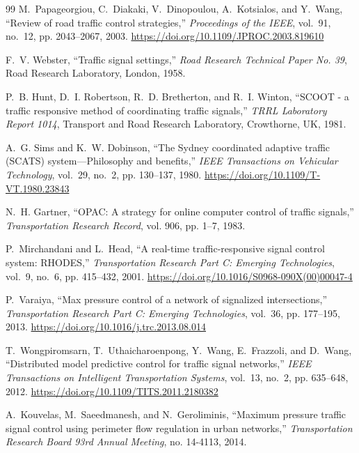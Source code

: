 \documentclass[11pt,journal,onecolumn]{article}
\begin{document}

\begin{thebibliography}{99}
M.~Papageorgiou, C.~Diakaki, V.~Dinopoulou, A.~Kotsialos, and Y.~Wang, ``Review of road traffic control strategies,'' \emph{Proceedings of the IEEE}, vol.~91, no.~12, pp. 2043--2067, 2003. \url{https://doi.org/10.1109/JPROC.2003.819610}

F.~V. Webster, ``Traffic signal settings,'' \emph{Road Research Technical Paper No. 39}, Road Research Laboratory, London, 1958.

P.~B. Hunt, D.~I. Robertson, R.~D. Bretherton, and R.~I. Winton, ``SCOOT - a traffic responsive method of coordinating traffic signals,'' \emph{TRRL Laboratory Report 1014}, Transport and Road Research Laboratory, Crowthorne, UK, 1981.

A.~G. Sims and K.~W. Dobinson, ``The Sydney coordinated adaptive traffic (SCATS) system---Philosophy and benefits,'' \emph{IEEE Transactions on Vehicular Technology}, vol.~29, no.~2, pp. 130--137, 1980. \url{https://doi.org/10.1109/T-VT.1980.23843}

N.~H. Gartner, ``OPAC: A strategy for online computer control of traffic signals,'' \emph{Transportation Research Record}, vol. 906, pp. 1--7, 1983.

P.~Mirchandani and L.~Head, ``A real-time traffic-responsive signal control system: RHODES,'' \emph{Transportation Research Part C: Emerging Technologies}, vol.~9, no.~6, pp. 415--432, 2001. \url{https://doi.org/10.1016/S0968-090X(00)00047-4}

P.~Varaiya, ``Max pressure control of a network of signalized intersections,'' \emph{Transportation Research Part C: Emerging Technologies}, vol.~36, pp. 177--195, 2013. \url{https://doi.org/10.1016/j.trc.2013.08.014}

T.~Wongpiromsarn, T.~Uthaicharoenpong, Y.~Wang, E.~Frazzoli, and D.~Wang, ``Distributed model predictive control for traffic signal networks,'' \emph{IEEE Transactions on Intelligent Transportation Systems}, vol.~13, no.~2, pp. 635--648, 2012. \url{https://doi.org/10.1109/TITS.2011.2180382}

A.~Kouvelas, M.~Saeedmanesh, and N.~Geroliminis, ``Maximum pressure traffic signal control using perimeter flow regulation in urban networks,'' \emph{Transportation Research Board 93rd Annual Meeting}, no. 14-4113, 2014.


\end{thebibliography}
\end{document}
